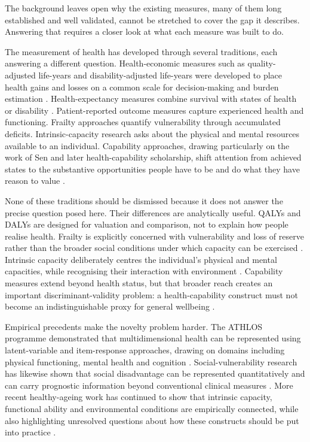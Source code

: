 The background leaves open why the existing measures, many of them long established and well validated, cannot be stretched to cover the gap it describes. Answering that requires a closer look at what each measure was built to do.

The measurement of health has developed through several traditions, each answering a different question. Health-economic measures such as quality-adjusted life-years and disability-adjusted life-years were developed to place health gains and losses on a common scale for decision-making and burden estimation \citep{whitehead_2010}. Health-expectancy measures combine survival with states of health or disability \citep{who_hale_2019}. Patient-reported outcome measures capture experienced health and functioning. Frailty approaches quantify vulnerability through accumulated deficits. Intrinsic-capacity research asks about the physical and mental resources available to an individual. Capability approaches, drawing particularly on the work of Sen and later health-capability scholarship, shift attention from achieved states to the substantive opportunities people have to be and do what they have reason to value \citep{sen_1993,venkatapuram_2011}.

None of these traditions should be dismissed because it does not answer the precise question posed here. Their differences are analytically useful. QALYs and DALYs are designed for valuation and comparison, not to explain how people realise health. Frailty is explicitly concerned with vulnerability and loss of reserve rather than the broader social conditions under which capacity can be exercised \citep{rockwood_mitnitski_2007}. Intrinsic capacity deliberately centres the individual's physical and mental capacities, while recognising their interaction with environment \citep{beard_intrinsic_2019}. Capability measures extend beyond health status, but that broader reach creates an important discriminant-validity problem: a health-capability construct must not become an indistinguishable proxy for general wellbeing \citep{icecap_o,icecap_o_construct}.

Empirical precedents make the novelty problem harder. The ATHLOS programme demonstrated that multidimensional health can be represented using latent-variable and item-response approaches, drawing on domains including physical functioning, mental health and cognition \citep{caballero_athlos_2017,oberhauser_2016}. Social-vulnerability research has likewise shown that social disadvantage can be represented quantitatively and can carry prognostic information beyond conventional clinical measures \citep{andrew_social_vulnerability_2008,social_vulnerability_share_2014}. More recent healthy-ageing work has continued to show that intrinsic capacity, functional ability and environmental conditions are empirically connected, while also highlighting unresolved questions about how these constructs should be put into practice \citep{who_2015_ageing}.

